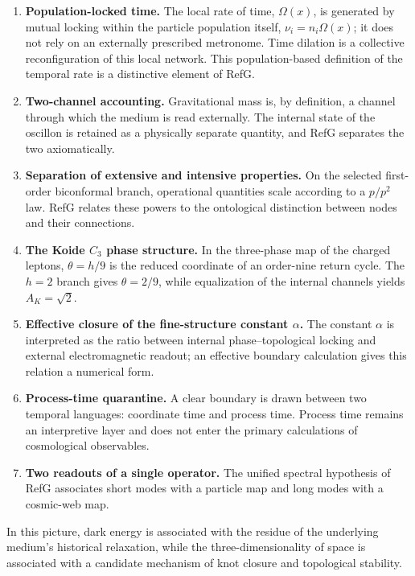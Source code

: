 \documentclass[11pt,a4paper]{article}
\begin{document}
\begin{enumerate}
\item \textbf{Population-locked time.} The local rate of time, $\Omega(x)$, is generated by mutual locking within the particle population itself, $\nu_i=n_i\Omega(x)$; it does not rely on an externally prescribed metronome. Time dilation is a collective reconfiguration of this local network. This population-based definition of the temporal rate is a distinctive element of RefG.

\item \textbf{Two-channel accounting.} Gravitational mass is, by definition, a channel through which the medium is read externally. The internal state of the oscillon is retained as a physically separate quantity, and RefG separates the two axiomatically.

\item \textbf{Separation of extensive and intensive properties.} On the selected first-order biconformal branch, operational quantities scale according to a $p/p^2$ law. RefG relates these powers to the ontological distinction between nodes and their connections.

\item \textbf{The Koide $C_3$ phase structure.} In the three-phase map of the charged leptons, $\theta=h/9$ is the reduced coordinate of an order-nine return cycle. The $h=2$ branch gives $\theta=2/9$, while equalization of the internal channels yields $A_K=\sqrt{2}$.

\item \textbf{Effective closure of the fine-structure constant $\alpha$.} The constant $\alpha$ is interpreted as the ratio between internal phase--topological locking and external electromagnetic readout; an effective boundary calculation gives this relation a numerical form.

\item \textbf{Process-time quarantine.} A clear boundary is drawn between two temporal languages: coordinate time and process time. Process time remains an interpretive layer and does not enter the primary calculations of cosmological observables.

\item \textbf{Two readouts of a single operator.} The unified spectral hypothesis of RefG associates short modes with a particle map and long modes with a cosmic-web map.
\end{enumerate}

In this picture, dark energy is associated with the residue of the underlying medium's historical relaxation, while the three-dimensionality of space is associated with a candidate mechanism of knot closure and topological stability.
\end{document}

